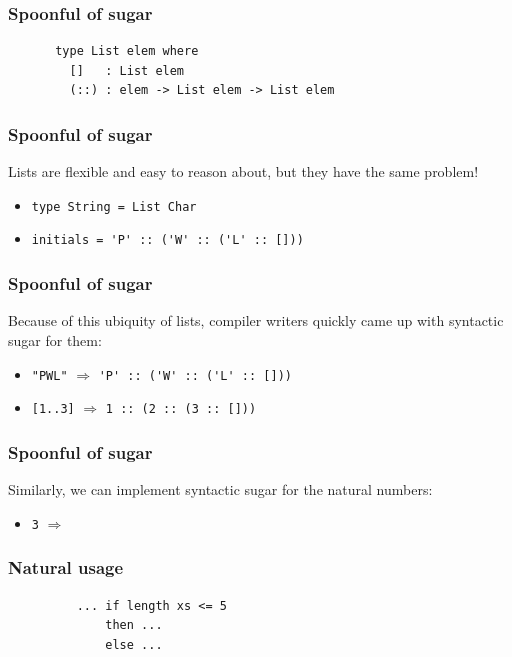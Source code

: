 \documentclass{beamer}
\begin{document}
  \begin{frame}[fragile]
    \frametitle{Spoonful of sugar}
    \begin{figure}
    {\color{dark-gray}
      \centering
\begin{BVerbatim}
 type List elem where
   []   : List elem
   (::) : elem -> List elem -> List elem
\end{BVerbatim}
    }
    \end{figure}
  \end{frame}
  \begin{frame}[fragile]
    \frametitle{Spoonful of sugar}
    Lists are flexible and easy to reason about, but they have the same problem!
    \begin{itemize}
      \item<2 -> {\color{dark-gray} \verb-type String = List Char-}
      \item<3  > {\color{dark-gray} \verb-initials = 'P' :: ('W' :: ('L' :: []))-}
    \end{itemize}
  \end{frame}
  \begin{frame}[fragile]
    \frametitle{Spoonful of sugar}
    Because of this ubiquity of lists, compiler writers quickly came up with syntactic sugar for them:
    \begin{itemize}
      \item<2 -> {\color{dark-gray} \verb-"PWL"- $\Rightarrow$ \verb-'P' :: ('W' :: ('L' :: []))-}
      \item<3  > {\color{dark-gray} \verb-[1..3]- $\Rightarrow$ \verb-1 :: (2 :: (3 :: []))-}
    \end{itemize}
  \end{frame}
  \begin{frame}[fragile]
    \frametitle{Spoonful of sugar}
    Similarly, we can implement syntactic sugar for the natural numbers:
    \begin{itemize}
      \item<2 -> {\color{dark-gray} \verb-3- $\Rightarrow$ }
    \end{itemize}
  \end{frame}
  \begin{frame}[fragile]
    \frametitle{Natural usage}
    \begin{figure}
    {\color{dark-gray}
      \centering
\begin{BVerbatim}
    ... if length xs <= 5
        then ...
        else ...
\end{BVerbatim}
    }
    \end{figure}
  \end{frame}
\end{document}
